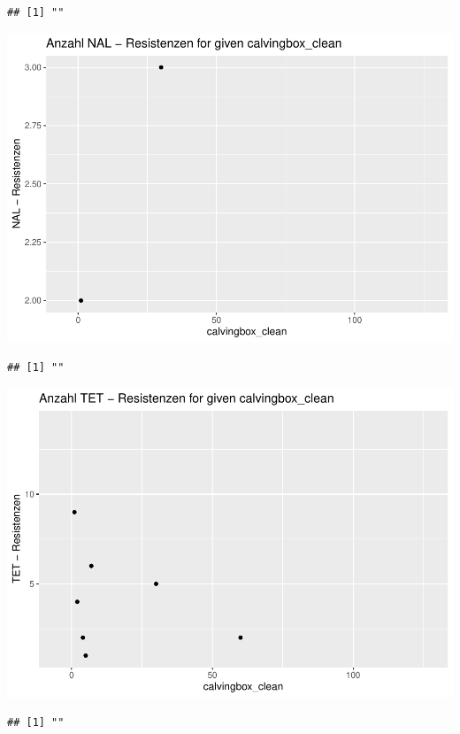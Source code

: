 \documentclass[
]{article}
\begin{document}
\begin{verbatim}
## [1] ""
\end{verbatim}

\includegraphics{NResistenzen_files/figure-latex/numerical_variables-27.pdf}

\begin{verbatim}
## [1] ""
\end{verbatim}

\includegraphics{NResistenzen_files/figure-latex/numerical_variables-28.pdf}

\begin{verbatim}
## [1] ""
\end{verbatim}
\end{document}
